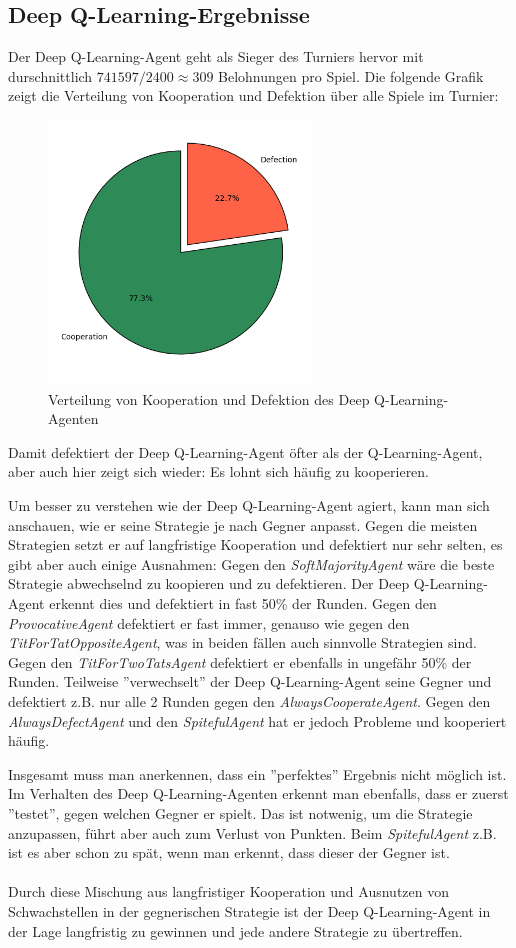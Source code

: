 \subsection{Deep Q-Learning-Ergebnisse}
Der Deep Q-Learning-Agent geht als Sieger des Turniers hervor mit durschnittlich $741597 / 2400 \approx 309$ Belohnungen pro Spiel. 
Die folgende Grafik zeigt die Verteilung von Kooperation und Defektion über alle Spiele im Turnier:
\begin{figure}[H]
    \centering
    \includegraphics[width=7cm]{../poster/logos/deepqPie.png}
    \caption{Verteilung von Kooperation und Defektion des Deep Q-Learning-Agenten}
    \label{fig:deepqverteilung}
\end{figure}
Damit defektiert der Deep Q-Learning-Agent öfter als der Q-Learning-Agent, aber auch hier zeigt sich wieder: Es lohnt sich 
häufig zu kooperieren. 

Um besser zu verstehen wie der Deep Q-Learning-Agent agiert, kann man sich anschauen, wie er seine Strategie
je nach Gegner anpasst. Gegen die meisten Strategien setzt er auf langfristige Kooperation und defektiert nur sehr selten, es gibt
aber auch einige Ausnahmen:
Gegen den \textit{SoftMajorityAgent} wäre die beste Strategie abwechselnd zu koopieren und zu defektieren. Der
Deep Q-Learning-Agent erkennt dies und defektiert in fast 50\% der Runden. Gegen den \textit{ProvocativeAgent} defektiert er
fast immer, genauso wie gegen den \textit{TitForTatOppositeAgent}, was in beiden fällen auch sinnvolle Strategien sind. Gegen den 
\textit{TitForTwoTatsAgent} defektiert er ebenfalls in ungefähr 50\% der Runden. Teilweise ''verwechselt'' der Deep Q-Learning-Agent
seine Gegner und defektiert z.B. nur alle 2 Runden gegen den \textit{AlwaysCooperateAgent}. Gegen den \textit{AlwaysDefectAgent}
und den \textit{SpitefulAgent} hat er jedoch Probleme und kooperiert häufig. 

Insgesamt muss man anerkennen, dass ein ''perfektes'' Ergebnis nicht möglich ist. Im Verhalten des Deep Q-Learning-Agenten erkennt man ebenfalls,
dass er zuerst ''testet'', gegen welchen Gegner er spielt. Das ist notwenig, um die Strategie anzupassen, führt aber auch zum Verlust von Punkten.
Beim \textit{SpitefulAgent} z.B. ist es aber schon zu spät, wenn man erkennt, dass dieser der Gegner ist. \\ \\
Durch diese Mischung aus langfristiger Kooperation und Ausnutzen von Schwachstellen in der gegnerischen Strategie ist der 
Deep Q-Learning-Agent in der Lage langfristig zu gewinnen und jede andere Strategie zu übertreffen.